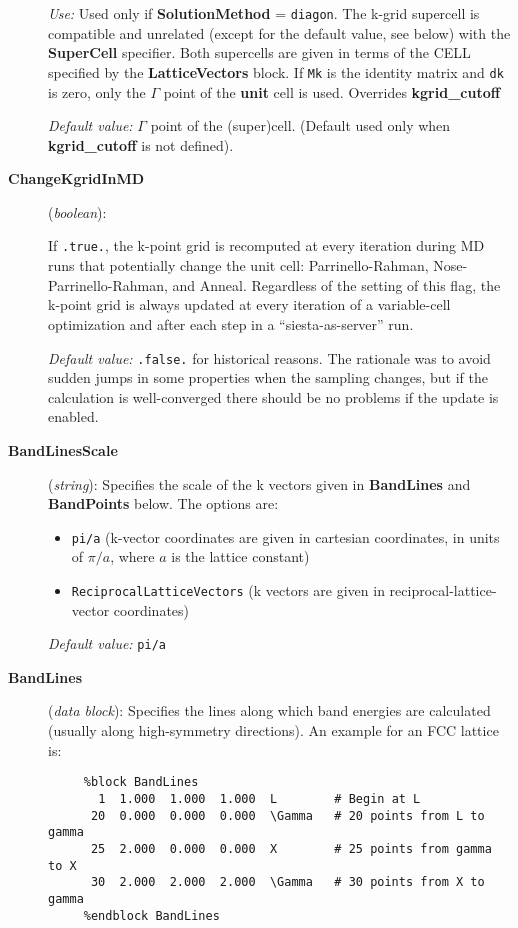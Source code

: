 \documentclass[11pt]{article}
\begin{document}
\begin{description}
{\it Use:} Used only if {\bf SolutionMethod} = {\tt diagon}.
The k-grid supercell is compatible and unrelated 
(except for the default value, see below)
with the {\bf SuperCell} specifier. Both supercells are given in 
terms of the CELL specified by the {\bf LatticeVectors} block.
If {\tt Mk} is the identity matrix and {\tt dk} 
is zero, only the $\Gamma$ point of the {\bf unit} cell is used. 
Overrides {\bf kgrid\_cutoff}

{\it Default value:} $\Gamma$ point of the (super)cell.
(Default used only when {\bf kgrid\_cutoff} is not defined).
        
\item[{\bf ChangeKgridInMD}] ({\it boolean}):

If {\tt .true.}, the k-point grid is
recomputed at every iteration during MD runs that potentially
change the unit cell: Parrinello-Rahman, Nose-Parrinello-Rahman, and
Anneal. Regardless of the setting of this flag, the k-point grid
is always updated at every iteration of a variable-cell optimization
and after each step in a ``siesta-as-server'' run.

{\it Default value:} {\tt .false.} for historical reasons. The
rationale was to avoid sudden jumps in some properties when the
sampling changes, but if the calculation is well-converged there
should be no problems if the update is enabled.

\item[{\bf BandLinesScale}] ({\it string}): 
Specifies the scale of the k vectors given in {\bf BandLines} 
and {\bf BandPoints} below.
The options are:
\begin{itemize}
\item {\tt pi/a} (k-vector coordinates are given in cartesian 
coordinates, in units of $\pi/a$, where $a$ is the lattice constant)
\item {\tt ReciprocalLatticeVectors} (k vectors are given in
reciprocal-lattice-vector coordinates)
\end{itemize}

{\it Default value:} {\tt pi/a}


\item[{\bf BandLines}] ({\it data block}): 
Specifies the lines along which band energies are calculated
(usually along high-symmetry directions).
An example for an FCC lattice is:

\begin{verbatim}
     %block BandLines
       1  1.000  1.000  1.000  L        # Begin at L
      20  0.000  0.000  0.000  \Gamma   # 20 points from L to gamma
      25  2.000  0.000  0.000  X        # 25 points from gamma to X
      30  2.000  2.000  2.000  \Gamma   # 30 points from X to gamma
     %endblock BandLines
\end{verbatim}


\end{description}
\end{document}
